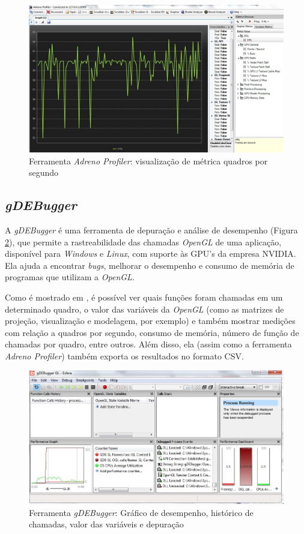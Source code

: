 	\begin{figure}[h]
	\centering
		\includegraphics[keepaspectratio=true,scale=0.35]{figuras/graph.jpg}
	\caption{Ferramenta \textit{Adreno Profiler}: visualização de métrica quadros por segundo}
	\label{graph}
	\end{figure}


\subsection{\textit{gDEBugger}}
	
	A \textit{gDEBugger} é uma ferramenta de depuração e análise de desempenho (Figura \ref{gdebugger_fer}), que permite a rastreabilidade das chamadas \textit{OpenGL} de uma aplicação, disponível para \textit{Windows} e \textit{Linux}, com suporte às GPU's da empresa NVIDIA. Ela ajuda a encontrar  \textit{bugs}, melhorar o desempenho e consumo de memória de programas que utilizam a \textit{OpenGL}. 

	Como é mostrado em \cite{gdebugger}, é possível ver quais funções foram chamadas em um determinado quadro, o valor das variáveis da \textit{OpenGL} (como as matrizes de projeção, visualização e modelagem, por exemplo) e também mostrar medições com relação a quadros por segundo, consumo de memória, número de função de chamadas por quadro, entre outros. Além disso, ela (assim como a ferramenta \textit{Adreno Profiler}) também exporta os resultados no formato CSV.  

	\begin{figure}[h]
	\centering
		\includegraphics[keepaspectratio=true,scale=0.65]{figuras/gdebugger_fer.jpg}
	\caption{Ferramenta \textit{gDEBugger}: Gráfico de desempenho, histórico de chamadas, valor das variáveis e depuração}
	\label{gdebugger_fer}
	\end{figure}


